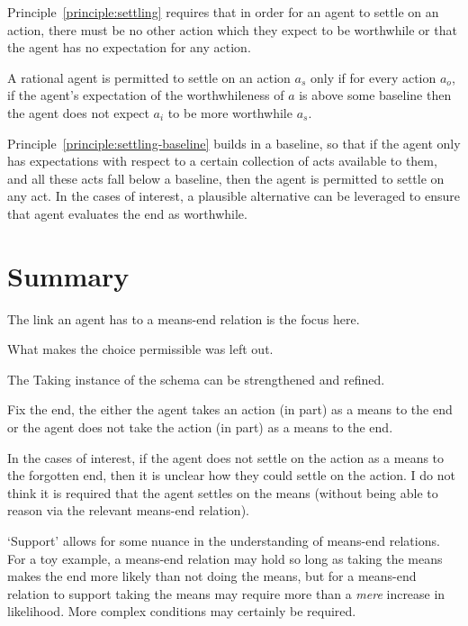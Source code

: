 \documentclass[10pt]{article}
\newcommand{\schemaName}[1]{\textsf{#1}}
\begin{document}
Principle~\ref{principle:settling} requires that in order for an agent to settle on an action, there must be no other action which they expect to be worthwhile or that the agent has no expectation for any action.

\begin{principle}\label{principle:settling-baseline}
  A rational agent is permitted to settle on an action \(a_{s}\) only if for every action \(a_{o}\), if the agent's expectation of the worthwhileness of \(a\) is above some baseline then the agent does not expect \(a_{i}\) to be more worthwhile \(a_{s}\).
\end{principle}

Principle~\ref{principle:settling-baseline} builds in a baseline, so that if the agent only has expectations with respect to a certain collection of acts available to them, and all these acts fall below a baseline, then the agent is permitted to settle on any act.
In the cases of interest, a plausible alternative can be leveraged to ensure that agent evaluates the end as worthwhile.

\newpage


\section{Summary}
\label{sec:summary}


The link an agent has to a means-end relation is the focus here.

What makes the choice permissible was left out.

The \schemaName{Taking} instance of the schema can be strengthened and refined.


Fix the end, the either the agent takes an action (in part) as a means to the end or the agent does not take the action (in part) as a means to the end.

In the cases of interest, if the agent does not settle on the action as a means to the forgotten end, then it is unclear how they could settle on the action.
I do not think it is required that the agent settles on the means (without being able to reason via the relevant means-end relation).


`Support' allows for some nuance in the understanding of means-end relations.
For a toy example, a means-end relation may hold so long as taking the means makes the end more likely than not doing the means, but for a means-end relation to support taking the means may require more than a \emph{mere} increase in likelihood.
More complex conditions may certainly be required.
\end{document}
